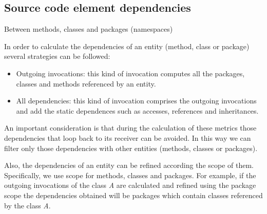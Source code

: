 \documentclass{sig-alternate}
\begin{document}
\subsection{Source code element dependencies}

Between methods, classes and packages (namespaces)

In order to calculate the dependencies of an entity (method, class or package) several strategies can be followed:
\begin{itemize}
\item Outgoing invocations: this kind of invocation computes all the packages, classes and methods referenced by an entity. 
\item All dependencies: this kind of invocation comprises the outgoing invocations and add the static dependences such as accesses, references and inheritances.
\end{itemize}
An important consideration is that during the calculation of these metrics those dependencies that loop back to its receiver can be avoided. In this way we can filter only those dependencies with other entities (methods, classes or packages).

Also, the dependencies of an entity can be refined according the scope of them. Specifically, we use scope for methods, classes and packages. For example, if the outgoing invocations of the class \emph{A} are calculated and refined using the package scope the dependencies obtained will be packages which contain classes referenced by the class \emph{A}.

\end{document}
